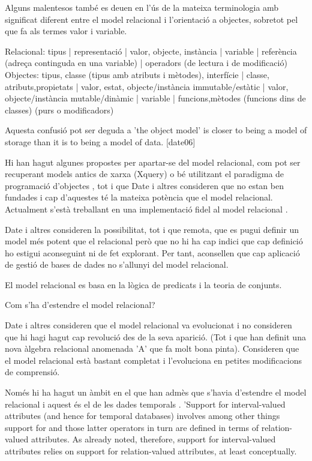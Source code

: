 Alguns malentesos també es deuen en l'ús de la mateixa terminologia amb significat diferent entre el model relacional i l'orientació a objectes, sobretot pel que fa als termes valor i variable. 

Relacional: tipus | representació |  valor, objecte, instància  | variable  | referència (adreça continguda en una variable) | operadors (de lectura i de modificació)
Objectes: tipus, classe (tipus amb atributs i mètodes), interfície | classe, atributs,propietats  |  valor, estat, objecte/instància immutable/estàtic |  valor, objecte/instància mutable/dinàmic  | variable | funcions,mètodes (funcions dins de classes) (purs o modificadors)

Aquesta confusió pot ser deguda a 'the object model' is closer to being a model of storage than it is to being a model of data. [date06]


Hi han hagut algunes propostes per apartar-se del model relacional, com pot ser recuperant models antics de xarxa (Xquery) o bé utilitzant el paradigma de programació d'objectes , tot i que Date i altres consideren que no estan ben fundades i cap d'aquestes té la mateixa potència que el model relacional. Actualment s'està treballant en una implementació fidel al model relacional . 

Date i altres consideren la possibilitat, tot i que remota, que es pugui definir un model més potent que el relacional però que no hi ha cap indici que cap definició ho estigui aconseguint ni de fet explorant. Per tant, aconsellen que cap aplicació de gestió de bases de dades no s'allunyi del model relacional.


El model relacional es basa en la lògica de predicats i la teoria de conjunts.





Com s'ha d'estendre el model relacional?

Date i altres consideren que el model relacional va evolucionat i no consideren que hi hagi hagut cap revolució des de la seva aparició. (Tot i que han definit una nova àlgebra relacional anomenada 'A' que fa molt bona pinta). Consideren que el model relacional està bastant completat i l'evoluciona en petites modificacions de comprensió. 

Només hi ha hagut un àmbit en el que han admès que s'havia d'estendre el model relacional i aquest és el de les dades temporals .  'Support for interval-valued attributes (and hence for temporal databases) involves among other things support for
and those latter operators in turn are defined in terms of relation-valued attributes. As already noted, therefore, support
for interval-valued attributes relies on support for relation-valued attributes, at least conceptually. 




